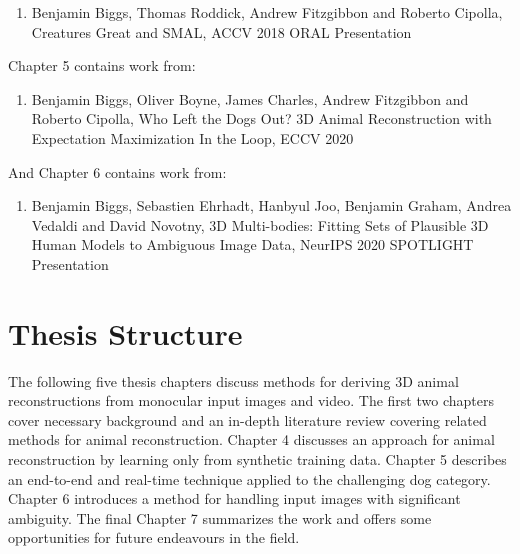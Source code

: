 \begin{enumerate}
    \item Benjamin Biggs, Thomas Roddick, Andrew Fitzgibbon and Roberto Cipolla, Creatures Great and SMAL, ACCV 2018 ORAL Presentation
\end{enumerate}

Chapter 5 contains work from:

\begin{enumerate}
    \item Benjamin Biggs, Oliver Boyne, James Charles, Andrew Fitzgibbon and Roberto Cipolla, Who Left the Dogs Out? 3D Animal Reconstruction with Expectation Maximization In the Loop, ECCV 2020
\end{enumerate}

And Chapter 6 contains work from:

\begin{enumerate}
    \item Benjamin Biggs, Sebastien Ehrhadt, Hanbyul Joo, Benjamin Graham, Andrea Vedaldi and David Novotny, 3D Multi-bodies: Fitting Sets of Plausible 3D Human Models to Ambiguous Image Data, NeurIPS 2020 SPOTLIGHT Presentation
\end{enumerate}

\section{Thesis Structure}  %

The following five thesis chapters discuss methods for deriving 3D animal reconstructions from monocular input images and video. The first two chapters cover necessary background and an in-depth literature review covering related methods for animal reconstruction. Chapter 4 discusses an approach for animal reconstruction by learning only from synthetic training data. Chapter 5 describes an end-to-end and real-time technique applied to the challenging dog category. Chapter 6 introduces a method for handling input images with significant ambiguity. The final Chapter 7 summarizes the work and offers some opportunities for future endeavours in the field.